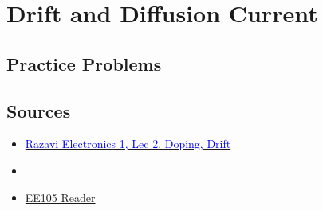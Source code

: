 \section{Drift and Diffusion Current}


\subsection{Practice Problems}

\subsection{Sources}
\begin{itemize}
    \item \href{https://www.youtube.com/watch?v=NWolpDgi6_Y}{\textcolor{blue}{Razavi Electronics 1, Lec 2. Doping, Drift}}
    \item  \item \href{https://file.notion.so/f/f/048d6522-202b-48d4-b5d9-bc005bd602e2/214bf1f0-292f-48d6-9016-737d9f5da155/ee105_reader_v3.pdf?id=237a4300-3dbe-47d1-888b-ffae90d8352b&table=block&spaceId=048d6522-202b-48d4-b5d9-bc005bd602e2&expirationTimestamp=1714435200000&signature=yx-H1qvZJIodPfazOpwXX0Ce2mWMG8skOHl45xoPxus&downloadName=ee105_reader_v3.pdf}{EE105 Reader}
\end{itemize}